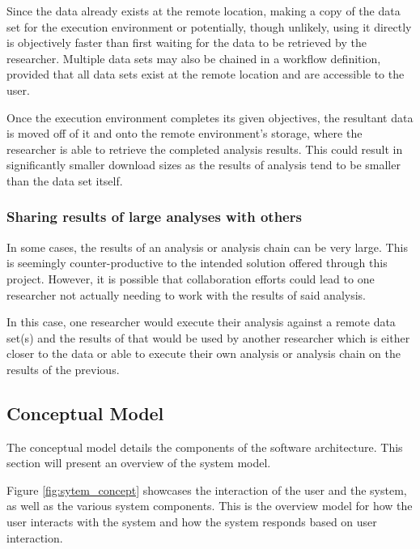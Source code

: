 Since the data already exists at the remote location, making a copy of the data set for the execution environment  or potentially, though unlikely, using it directly is objectively faster than first waiting for the data to be retrieved by the researcher. Multiple data sets may also be chained in a workflow definition, provided that all data sets exist at the remote location and are accessible to the user.

Once the execution environment completes its given objectives, the resultant data is moved off of it and onto the remote environment's storage, where the researcher is able to retrieve the completed analysis results. This could result in significantly smaller download sizes as the results of analysis tend to be smaller than the data set itself.

\subsubsection{Sharing results of large analyses with others}

In some cases, the results of an analysis or analysis chain can be very large. This is seemingly counter-productive to the intended solution offered through this project. However, it is possible that collaboration efforts could lead to one researcher not actually needing to work with the results of said analysis.

In this case, one researcher would execute their analysis against a remote data set(s) and the results of that would be used by another researcher which is either closer to the data or able to execute their own analysis or analysis chain on the results of the previous.

\subsection{Conceptual Model}

The conceptual model details the components of the software architecture. This section will present an overview of the system model.

Figure \ref{fig:sytem_concept} showcases the interaction of the user and the system, as well as the various system components. This is the overview model for how the user interacts with the system and how the system responds based on user interaction.

